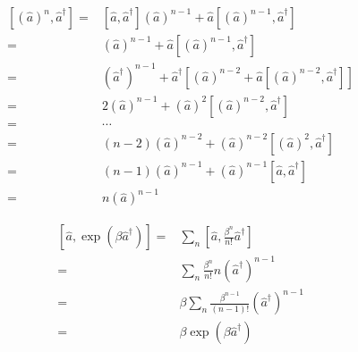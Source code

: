 \documentclass[twoside]{article}
\begin{document}
\begin{equation*}
    \begin{split}
        \left[\left(\hat{a}\right)^n, \hat{a}^{\dagger}\right] = & \left[\hat{a}, \hat{a}^\dagger\right] \left(\hat{a}\right)^{n-1} + \hat{a} \left[\left(\hat{a}\right)^{n-1}, \hat{a}^\dagger\right]                             \\
        =                                                        & \left(\hat{a}\right)^{n-1} + \hat{a} \left[\left(\hat{a}\right)^{n-1}, \hat{a}^\dagger\right]                                                                   \\
        =                                                        & \left(\hat{a}^\dagger\right)^{n-1} + \hat{a}^\dagger \left[\left(\hat{a}\right)^{n-2} + \hat{a} \left[\left(\hat{a}\right)^{n-2}, \hat{a}^\dagger\right]\right] \\
        =                                                        & 2 \left(\hat{a}\right)^{n-1} + \left(\hat{a}\right)^2 \left[\left(\hat{a}\right)^{n-2}, \hat{a}^\dagger\right]                                                  \\
        =                                                        & \cdots                                                                                                                                                          \\
        =                                                        & \left(n-2\right) \left(\hat{a}\right)^{n-2} + \left(\hat{a}\right)^{n-2} \left[\left(\hat{a}\right)^{2}, \hat{a}^\dagger\right]                                 \\
        =                                                        & \left(n-1\right) \left(\hat{a}\right)^{n-1} + \left(\hat{a}\right)^{n-1} \left[\hat{a}, \hat{a}^\dagger\right]                                                  \\
        =                                                        & n \left(\hat{a}\right)^{n-1}
    \end{split}
\end{equation*}

\begin{equation*}
    \begin{split}
        \left[\hat{a}, \exp\left(\beta \hat{a}^\dagger\right)\right] = & \sum_n \left[\hat{a}, \frac{\beta^n}{n!} \hat{a}^\dagger\right]                        \\
        =                                                              & \sum_n \frac{\beta^n}{n!} n \left(\hat{a}^\dagger \right)^{n-1}                        \\
        =                                                              & \beta \sum_n \frac{\beta^{n-1}}{\left(n-1\right)!} \left(\hat{a}^\dagger \right)^{n-1} \\
        =                                                              & \beta \exp\left(\beta \hat{a}^\dagger\right)
    \end{split}
\end{equation*}
\end{document}
